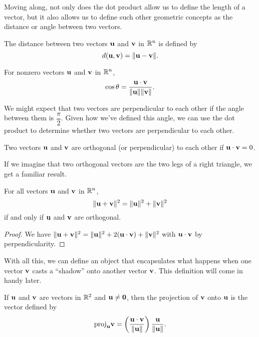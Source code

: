 \documentclass[../m073main.tex]{subfiles}
\begin{document}
Moving along, not only does the dot product allow us to define the length of a vector, but it also allows us to define such other geometric concepts as the distance or angle between two vectors.

\begin{definition}[Distance]
	The distance between two vectors $\mathbf{u}$ and $\mathbf{v}$ in $\mathbb{R}^n$ is defined by
	\[ d(\mathbf{u}, \mathbf{v}) = \|\mathbf{u} - \mathbf{v}\|. \]
\end{definition}

\begin{definition}[Angle]
	For nonzero vectors $\mathbf{u}$ and $\mathbf{v}$ in $\mathbb{R}^n$,
	\[ \cos \theta = \frac{\mathbf{u} \cdot \mathbf{v}}{\|\mathbf{u}\| \|\mathbf{v}\|}. \]
\end{definition}

We might expect that two vectors are perpendicular to each other if the angle between them is $\dfrac{\pi}{2}$.
Given how we've defined this angle, we can use the dot product to determine whether two vectors are perpendicular to each other.

\begin{definition}[Orthogonality]
	Two vectors $\mathbf{u}$ and $\mathbf{v}$ are orthogonal (or perpendicular) to each other if $\mathbf{u} \cdot \mathbf{v} = 0$.
\end{definition}

If we imagine that two orthogonal vectors are the two legs of a right triangle, we get a familiar result.

\begin{theorem}
	For all vectors $\mathbf{u}$ and $\mathbf{v}$ in $\mathbb{R}^n$,
	\[ \|\mathbf{u} + \mathbf{v}\|^2 = \|\mathbf{u}\|^2 + \|\mathbf{v}\|^2 \]
	if and only if $\mathbf{u}$ and $\mathbf{v}$ are orthogonal.
\end{theorem}

\begin{proof}
	We have $\|\mathbf{u} + \mathbf{v}\|^2 = \| \mathbf{u} \|^2 + 2 (\mathbf{u} \cdot \mathbf{v}) + \| \mathbf{v} \|^2$ with $\mathbf{u} \cdot \mathbf{v}$ by perpendicularity.
\end{proof}

With all this, we can define an object that encapsulates what happens when one vector $\mathbf{v}$ casts a ``shadow'' onto another vector $\mathbf{v}$.
This definition will come in handy later.

\begin{definition}
	If $\mathbf{u}$ and $\mathbf{v}$ are vectors in $\mathbb{R}^2$ and $\mathbf{u} \neq \mathbf{0}$, then the projection of $\mathbf{v}$ onto $\mathbf{u}$ is the vector defined by
	\[ \textrm{proj}_{\mathbf{u}} \mathbf{v} = \left( \frac{\mathbf{u} \cdot \mathbf{v}}{\|\mathbf{u}\|} \right) \frac{\mathbf{u}}{\|\mathbf{u}\|}. \]
\end{definition}
\end{document}
